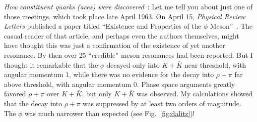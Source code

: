 \documentclass[12pt]{article}
\begin{document}
{\it How constituent quarks (aces) were discovered}~\cite{GZorigins}: Let me tell you about just one of those meetings, which took place late April 1963. On April 15, {\it Physical Review Letters} published a paper titled ``Existence and Properties of the $\phi$ Meson''~\cite{phi2}. The casual reader of that article, and perhaps even the authors themselves, might have thought this was just a confirmation of the existence of yet another resonance. By then over 25 ``credible'' meson resonances had been reported.
But I thought it remarkable that the $\phi$ decayed only into $K + \bar K$ near threshold, with angular momentum 1, while there was no evidence for the decay into $\rho + \pi$ far above threshold, with angular momentum 0. Phase space arguments greatly favored $\rho + \pi$ over $K + \bar K$, but only $K + \bar K$ was observed. My calculations showed that the decay into $\rho +\pi$ was suppressed by at least two orders of magnitude. The $\phi$ was much narrower than expected (see Fig.~\ref{fig:dalitz})!
\end{document}
